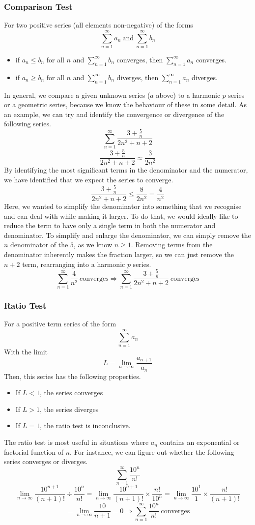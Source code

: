 \documentclass[12pt]{report}
\newcommand{\mand}{\:\mathrm{and}\:}
\newcommand{\limit}{\lim\limits}
\newcommand{\sumninf}[1][1]{\sum\limits_{n = #1}^\infty}
\begin{document}
\begin{flushleft}
\subsubsection*{Comparison Test}
For two positive series (all elements non-negative) of the forms
\[\sumninf a_n \mand \sumninf b_n\]
\begin{itemize}
    \item if \(a_n \leq b_n\) for all \(n\) and \(\sumninf b_n\) converges, 
        then \(\sumninf a_n\) converges.
    \item if \(a_n \geq b_n\) for all \(n\) and \(\sumninf b_n\) diverges,
        then \(\sumninf a_n\) diverges.
\end{itemize}
In general, we compare a given unknown series (\(a\) above) to a harmonic \(p\)
series or a geometric series, because we know the behaviour of these in some 
detail. As an example, we can try and identify the convergence or divergence
of the following series.
\[\sumninf \frac{3 + \frac{5}{n}}{2n^2 + n + 2}\]
\[\frac{3 + \frac{5}{n}}{2n^2 + n + 2} \approx \frac{3}{2n^2}\]
By identifying the most significant terms in the denominator and the numerator,
we have identified that we expect the series to converge.
\[\frac{3 + \frac{5}{n}}{2n^2 + n + 2} \leq \frac{8}{2n^2} = \frac{4}{n^2}\]
Here, we wanted to simplify the denominator into something that we recognise
and can deal with while making it larger. To do that, we would ideally like
to reduce the term to have only a single term in both the numerator and 
denominator. To simplify and enlarge the denominator, we can simply remove the
\(n\) denominator of the \(5\), as we know \(n \geq 1\). Removing terms from 
the denominator inherently makes the fraction larger, so we can just remove the
\(n + 2\) term, rearranging into a harmonic \(p\) series.
\[\sumninf \frac{4}{n^2} \:\mathrm{converges} \Rightarrow \sumninf \frac{3 + 
\frac{5}{n}}{2n^2 + n + 2} \:\mathrm{converges}\]

\subsubsection*{Ratio Test}
For a positive term series of the form
\[\sumninf a_n\]
With the limit
\[L = \limit_{n\rightarrow\infty} \frac{a_{n + 1}}{a_n}\]
Then, this series has the following properties.
\begin{itemize}
    \item If \(L < 1\), the series converges
    \item If \(L > 1\), the series diverges
    \item If \(L = 1\), the ratio test is inconclusive.
\end{itemize}
The ratio test is most useful in situations where \(a_n\) contains an 
exponential or factorial function of \(n\). For instance, we can figure out
whether the following series converges or diverges.
\[\sumninf \frac{10^n}{n!}\]
\[\limit_{n\rightarrow\infty} \frac{10^{n + 1}}{(n + 1)!}\div\frac{10^n}{n!} = 
\limit_{n\rightarrow\infty} \frac{10^{n + 1}}{(n + 1)!}\times\frac{n!}{10^n}
= \limit_{n\rightarrow\infty} \frac{10^1}{1} \times \frac{n!}{(n + 1)!}\]
\[ = \limit_{n\rightarrow\infty} \frac{10}{n + 1} = 0 \Rightarrow 
\sumninf \frac{10^n}{n!}\:\mathrm{converges}\]


\end{flushleft}
\end{document}
